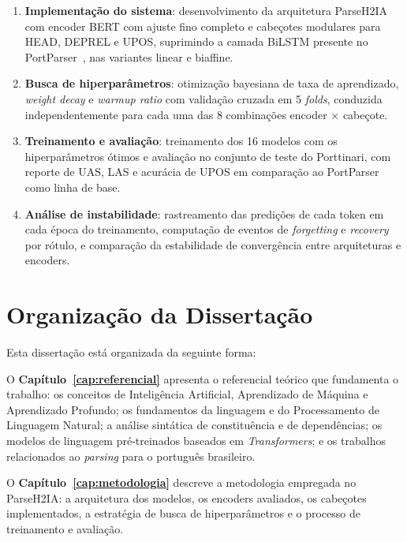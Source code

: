 \begin{enumerate}
  \item \textbf{Implementação do sistema}: desenvolvimento da arquitetura ParseH2IA com encoder
        BERT com ajuste fino completo e cabeçotes modulares para HEAD, DEPREL e UPOS,
        suprimindo a camada BiLSTM presente no PortParser~\citep{lopes2024towards}, nas
        variantes linear e biaffine.

  \item \textbf{Busca de hiperparâmetros}: otimização bayesiana de taxa de aprendizado,
        \textit{weight decay} e \textit{warmup ratio} com validação cruzada em 5 \textit{folds},
        conduzida independentemente para cada uma das 8 combinações encoder × cabeçote.

  \item \textbf{Treinamento e avaliação}: treinamento dos 16 modelos com os hiperparâmetros
        ótimos e avaliação no conjunto de teste do Porttinari, com reporte de UAS, LAS e
        acurácia de UPOS em comparação ao PortParser como linha de base.

  \item \textbf{Análise de instabilidade}: rastreamento das predições de cada token em cada
        época do treinamento, computação de eventos de \textit{forgetting} e \textit{recovery}
        por rótulo, e comparação da estabilidade de convergência entre arquiteturas e encoders.
\end{enumerate}

\section{Organização da Dissertação}
\label{sec:organizacao}

Esta dissertação está organizada da seguinte forma:

O \textbf{Capítulo~\ref{cap:referencial}} apresenta o referencial teórico que fundamenta o
trabalho: os conceitos de Inteligência Artificial, Aprendizado de Máquina e Aprendizado
Profundo; os fundamentos da linguagem e do Processamento de Linguagem Natural; a análise
sintática de constituência e de dependências; os modelos de linguagem pré-treinados baseados
em \textit{Transformers}; e os trabalhos relacionados ao \textit{parsing} para o português
brasileiro.

O \textbf{Capítulo~\ref{cap:metodologia}} descreve a metodologia empregada no ParseH2IA:
a arquitetura dos modelos, os encoders avaliados, os cabeçotes implementados, a estratégia
de busca de hiperparâmetros e o processo de treinamento e avaliação.

